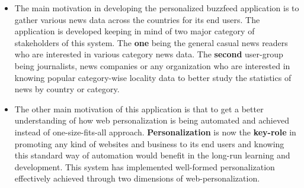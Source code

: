 \begin{itemize}
\item 
The main motivation in developing the personalized buzzfeed application is to gather various news data across the countries for its end users. The application is developed keeping in mind of two major category of stakeholders of this system.
The \textbf{one} being the general casual news readers who are interested in various category news data. The \textbf{second} user-group being journalists, news companies or any organization who are interested in knowing popular category-wise locality data to better study the statistics of news by country or category.

\item

The other main motivation of this application is that to get a better understanding of how web personalization is being automated and achieved instead of one-size-fits-all approach. 
\textbf{Personalization} is now the \textbf{key-role} in promoting any kind of websites and business to its end users and knowing this standard way of automation would benefit in the long-run learning and development. This system has implemented well-formed personalization effectively achieved through two dimensions of web-personalization. 

\end{itemize}  





